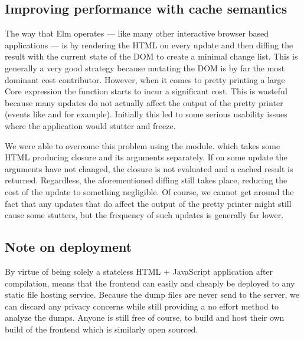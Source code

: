 \subsection{Improving performance with cache semantics}

The way that Elm operates --- like many other interactive browser based applications --- is by rendering the HTML on every
update and then diffing the result with the current state of the DOM to create a minimal change list. This is generally a very
good strategy because mutating the DOM is by far the most dominant cost contributor. However, when it comes to pretty printing a
large Core expression the  function starts to incur a significant cost. This is wasteful because many updates do not
actually affect the output of the pretty printer (events like  and  for example).
Initially this led to some serious usability issues where the application would stutter and freeze.

We were able to overcome this problem using the  module. which takes some HTML producing closure and its arguments
separately. If on some update the arguments have not changed, the closure is not evaluated and a cached result is returned. Regardless,
the aforementioned diffing still takes place, reducing the cost of the update to something negligible. Of course, we cannot get around the fact that
any updates that do affect the output of the pretty printer might still cause some stutters, but the frequency of such updates is 
generally far lower.

\subsection{Note on deployment}

By virtue of being solely a stateless HTML + JavaScript application after compilation, means that the frontend can
easily and cheaply be deployed to any static file hosting service. Because the dump files are never send to the server,
we can discard any privacy concerns while still providing a no effort method to analyze the dumps. Anyone is still free
of course, to build and host their own build of the frontend which is similarly open sourced.

